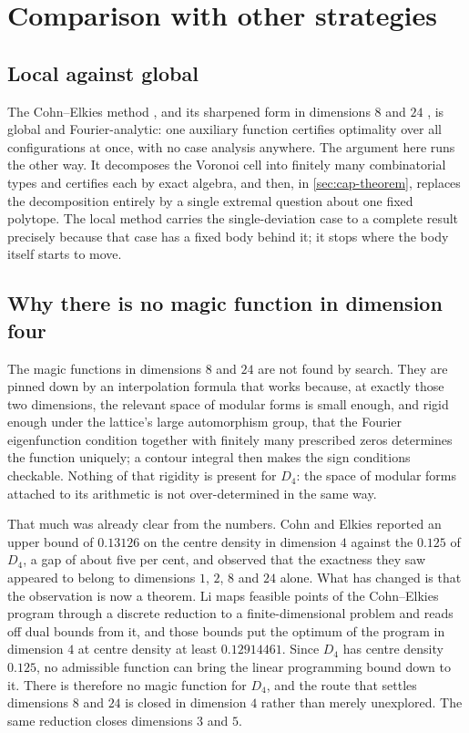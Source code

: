 \documentclass[11pt,reqno]{amsart}
\renewcommand{\_}{\origunderscore\allowbreak}
\numberwithin{equation}{section}
\theoremstyle{plain}
\theoremstyle{definition}
\theoremstyle{remark}
\begin{document}
\section{Comparison with other strategies}\label{sec:comparison-methods}

\subsection{Local against global}

The Cohn--Elkies method \cite{CE03}, and its sharpened form in
dimensions $8$ and $24$ \cite{Via17,CKM17}, is global and
Fourier-analytic: one auxiliary function certifies optimality over all
configurations at once, with no case analysis anywhere. The argument
here runs the other way. It decomposes the Voronoi cell into finitely
many combinatorial types and certifies each by exact algebra, and then,
in \cref{sec:cap-theorem}, replaces the decomposition entirely by a
single extremal question about one fixed polytope. The local method
carries the single-deviation case to a complete result precisely because
that case has a fixed body behind it; it stops where the body itself
starts to move.

\subsection{Why there is no magic function in dimension four}

The magic functions in dimensions $8$ and $24$ are not found by search.
They are pinned down by an interpolation formula that works because, at
exactly those two dimensions, the relevant space of modular forms is
small enough, and rigid enough under the lattice's large automorphism
group, that the Fourier eigenfunction condition together with finitely
many prescribed zeros determines the function uniquely; a contour
integral then makes the sign conditions checkable. Nothing of that
rigidity is present for $D_4$: the space of modular forms attached to
its arithmetic is not over-determined in the same way.

That much was already clear from the numbers. Cohn and Elkies
\cite{CE03} reported an upper bound of $0.13126$ on the centre density
in dimension $4$ against the $0.125$ of $D_4$, a gap of about five per
cent, and observed that the exactness they saw appeared to belong to
dimensions $1$, $2$, $8$ and $24$ alone. What has changed is that the
observation is now a theorem. Li \cite{Li25} maps feasible points of
the Cohn--Elkies program through a discrete reduction to a
finite-dimensional problem and reads off dual bounds from it, and those
bounds put the optimum of the program in dimension $4$ at centre density
at least $0.12914461$. Since $D_4$ has centre density $0.125$, no
admissible function can bring the linear programming bound down to it.
There is therefore no magic function for $D_4$, and the route that
settles dimensions $8$ and $24$ is closed in dimension $4$ rather than
merely unexplored. The same reduction closes dimensions $3$ and $5$.
\end{document}
